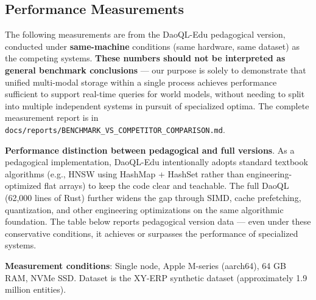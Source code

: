 \documentclass[11pt,a4paper]{article}
\begin{document}
\subsection{Performance
Measurements}\label{performance-measurements}

The following measurements are from the DaoQL-Edu pedagogical version,
conducted under \textbf{same-machine} conditions (same hardware, same
dataset) as the competing systems. \textbf{These numbers should not be
interpreted as general benchmark conclusions} --- our purpose is solely
to demonstrate that unified multi-modal storage within a single process
achieves performance sufficient to support real-time queries for world
models, without needing to split into multiple independent systems in
pursuit of specialized optima. The complete measurement report is in
\texttt{docs/reports/BENCHMARK\_VS\_COMPETITOR\_COMPARISON.md}.

\textbf{Performance distinction between pedagogical and full versions}.
As a pedagogical implementation, DaoQL-Edu intentionally adopts standard
textbook algorithms (e.g., HNSW using HashMap + HashSet rather than
engineering-optimized flat arrays) to keep the code clear and teachable.
The full DaoQL (62,000 lines of Rust) further widens the gap through
SIMD, cache prefetching, quantization, and other engineering
optimizations on the same algorithmic foundation. The table below
reports pedagogical version data --- even under these conservative
conditions, it achieves or surpasses the performance of specialized
systems.

\textbf{Measurement conditions}: Single node, Apple M-series (aarch64),
64 GB RAM, NVMe SSD. Dataset is the XY-ERP synthetic dataset
(approximately 1.9 million entities).
\end{document}
